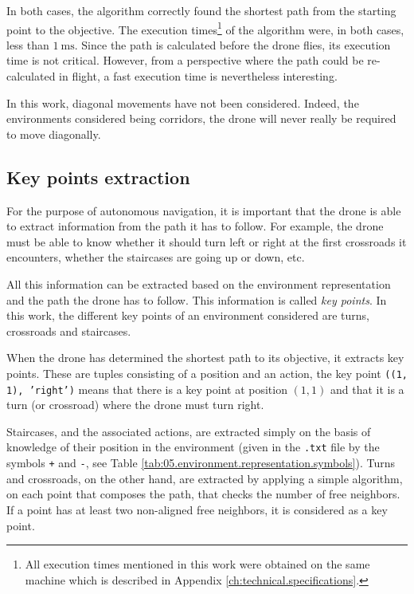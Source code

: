 In both cases, the algorithm correctly found the shortest path from the starting point to the objective. The execution times\footnote{All execution times mentioned in this work were obtained on the same machine which is described in Appendix \ref{ch:technical.specifications}.} of the algorithm were, in both cases, less than $\SI{1}{\milli\second}$. Since the path is calculated before the drone flies, its execution time is not critical. However, from a perspective where the path could be re-calculated in flight, a fast execution time is nevertheless interesting.

\begin{note}
    In this work, diagonal movements have not been considered. Indeed, the environments considered being corridors, the drone will never really be required to move diagonally.
\end{note}

\subsection{Key points extraction}\label{sec:05.key.points.extraction}

For the purpose of autonomous navigation, it is important that the drone is able to extract information from the path it has to follow. For example, the drone must be able to know whether it should turn left or right at the first crossroads it encounters, whether the staircases are going up or down, etc.

All this information can be extracted based on the environment representation and the path the drone has to follow. This information is called \emph{key points}. In this work, the different key points of an environment considered are turns, crossroads and staircases.

When the drone has determined the shortest path to its objective, it extracts key points. These are tuples consisting of a position and an action, \eg{} the key point \texttt{((1, 1), 'right')} means that there is a key point at position $(1, 1)$ and that it is a turn (or crossroad) where the drone must turn right.

Staircases, and the associated actions, are extracted simply on the basis of knowledge of their position in the environment (given in the \texttt{.txt} file by the symbols \texttt{+} and \texttt{-}, see Table \ref{tab:05.environment.representation.symbols}). Turns and crossroads, on the other hand, are extracted by applying a simple algorithm, on each point that composes the path, that checks the number of free neighbors. If a point has at least two non-aligned free neighbors, it is considered as a key point.

